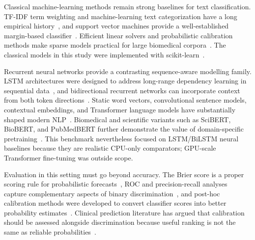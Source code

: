 Classical machine-learning methods remain strong baselines for text classification. TF-IDF term weighting and machine-learning text categorization have a long empirical history~\cite{salton1988term,sebastiani2002text}, and support vector machines provide a well-established margin-based classifier~\cite{cortes1995svm,joachims1998text}. Efficient linear solvers and probabilistic calibration methods make sparse models practical for large biomedical corpora~\cite{fan2008liblinear,platt1999probabilistic}. The classical models in this study were implemented with scikit-learn~\cite{pedregosa2011sklearn}.

Recurrent neural networks provide a contrasting sequence-aware modelling family. LSTM architectures were designed to address long-range dependency learning in sequential data~\cite{hochreiter1997lstm}, and bidirectional recurrent networks can incorporate context from both token directions~\cite{schuster1997brnn}. Static word vectors, convolutional sentence models, contextual embeddings, and Transformer language models have substantially shaped modern NLP~\cite{mikolov2013word2vec,kim2014cnn,peters2018elmo,vaswani2017attention,devlin2019bert}. Biomedical and scientific variants such as SciBERT, BioBERT, and PubMedBERT further demonstrate the value of domain-specific pretraining~\cite{beltagy2019scibert,lee2020biobert,gu2021pubmedbert}. This benchmark nevertheless focused on LSTM/BiLSTM neural baselines because they are realistic CPU-only comparators; GPU-scale Transformer fine-tuning was outside scope.

Evaluation in this setting must go beyond accuracy. The Brier score is a proper scoring rule for probabilistic forecasts~\cite{brier1950verification}, ROC and precision-recall analyses capture complementary aspects of binary discrimination~\cite{fawcett2006roc,davis2006prroc,saito2015pr}, and post-hoc calibration methods were developed to convert classifier scores into better probability estimates~\cite{niculescu2005probabilities,zadrozny2002classifier,guo2017calibration}. Clinical prediction literature has argued that calibration should be assessed alongside discrimination because useful ranking is not the same as reliable probabilities~\cite{vancalster2016hierarchy,vancalster2019calibration,austin2019ici}.

